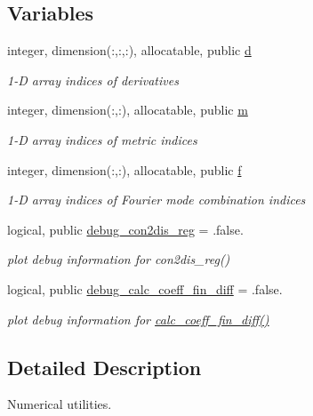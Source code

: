 \subsection*{Variables}
\begin{DoxyCompactItemize}
\item 
integer, dimension(\+:,\+:,\+:), allocatable, public \hyperlink{namespacenum__utilities_a763215553acfcc054b1ec1bc207a1793}{d}
\begin{DoxyCompactList}\small\item\em 1-\/D array indices of derivatives \end{DoxyCompactList}\item 
integer, dimension(\+:,\+:), allocatable, public \hyperlink{namespacenum__utilities_ad7a7ae2abf02a2df9e00b2aca669617c}{m}
\begin{DoxyCompactList}\small\item\em 1-\/D array indices of metric indices \end{DoxyCompactList}\item 
integer, dimension(\+:,\+:), allocatable, public \hyperlink{namespacenum__utilities_a8e3399292fcb3a5fc35ae87f7811bbb5}{f}
\begin{DoxyCompactList}\small\item\em 1-\/D array indices of Fourier mode combination indices \end{DoxyCompactList}\item 
logical, public \hyperlink{namespacenum__utilities_ab7138a230a3c494c7a2b71b2a7fffc0a}{debug\+\_\+con2dis\+\_\+reg} = .false.
\begin{DoxyCompactList}\small\item\em plot debug information for con2dis\+\_\+reg() \end{DoxyCompactList}\item 
logical, public \hyperlink{namespacenum__utilities_ae20985c8049d39f987fa23d728688cbc}{debug\+\_\+calc\+\_\+coeff\+\_\+fin\+\_\+diff} = .false.
\begin{DoxyCompactList}\small\item\em plot debug information for \hyperlink{namespacenum__utilities_a4dffe3beba7165dd17cff19a99a9e2ac}{calc\+\_\+coeff\+\_\+fin\+\_\+diff()} \end{DoxyCompactList}\end{DoxyCompactItemize}


\subsection{Detailed Description}
Numerical utilities. 

